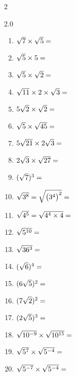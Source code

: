 \documentclass[main.tex]{subfiles}
\begin{document}
 \begin{exercise}[\cancel{\faCalculator}]\label{chap08:exo:radicaux:simplifier2}\hfill\vspace{-0.5em} 
 	\begin{multicols}{2}
 		\begin{spacing}{2.0}
 		\begin{enumerate}[label={}, leftmargin=*]  
 			\item $\sqrt{7}\times \sqrt{5}=\dotfill$
 			\item $\sqrt{5}\times 5=\dotfill$
 			\item $\sqrt{5}\times \sqrt{2}=\dotfill$
 			\item $\sqrt{11}\times2 \times  \sqrt{3}=\dotfill$
 			\item $5\sqrt{2} \times  \sqrt{2}=\dotfill$
 			\item $\sqrt{5}\times \sqrt{45}=\dotfill$
 			\item $5\sqrt{21}\times 2\sqrt{3}=\dotfill$  
 			\item $2\sqrt{3} \times  \sqrt{27}=\dotfill$
 			\item $(\sqrt{7})^3=\dotfill$
 			\item $\sqrt{3^8}=\sqrt{\big(3^4\big)^2}=\dotfill$
 			\item $\sqrt{4^5}=\sqrt{4^4\times 4}=\dotfill$
 			\item $\sqrt{5^{10}}=\dotfill$
 			\item $\sqrt{36^3}= \dotfill$
 			\item $(\sqrt{6})^4=\dotfill$
 			\item $(6\sqrt{5})^2=\dotfill$
 			\item $(7\sqrt{2})^2=\dotfill$ 
 			\item $(2\sqrt{5})^3=\dotfill$ 
 			\item $\sqrt{10^{-9}}\times \sqrt{10^{15}}=\dotfill$
 			\item $\sqrt{5^{7}}\times \sqrt{5^{-4}}=\dotfill$
 			\item $\sqrt{5^{-7}}\times \sqrt{5^{-4}}=\dotfill$
 		\end{enumerate}
 	\end{spacing}
 	\end{multicols}
 \end{exercise}
\end{document}
